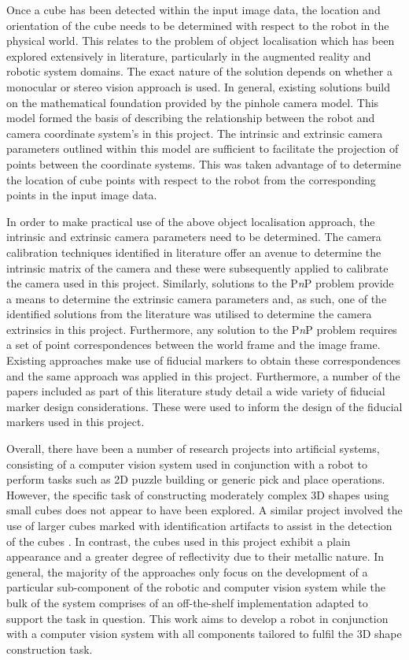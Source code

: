 Once a cube has been detected within the input image data, the location and orientation of the cube needs to be determined with respect to the robot in the physical world. This relates to the problem of object localisation which has been explored extensively in literature, particularly in the augmented reality and robotic system domains. The exact nature of the solution depends on whether a monocular or stereo vision approach is used. In general, existing solutions build on the mathematical foundation provided by the pinhole camera model. This model formed the basis of describing the relationship between the robot and camera coordinate system's in this project. The intrinsic and extrinsic camera parameters outlined within this model are sufficient to facilitate the projection of points between the coordinate systems. This was taken advantage of to determine the location of cube points with respect to the robot from the corresponding points in the input image data.

In order to make practical use of the above object localisation approach, the intrinsic and extrinsic camera parameters need to be determined. The camera calibration techniques identified in literature offer an avenue to determine the intrinsic matrix of the camera and these were subsequently applied to calibrate the camera used in this project. Similarly, solutions to the P\textit{n}P problem provide a means to determine the extrinsic camera parameters and, as such, one of the identified solutions from the literature was utilised to determine the camera extrinsics in this project. Furthermore, any solution to the P\textit{n}P problem requires a set of point correspondences between the world frame and the image frame. Existing approaches make use of fiducial markers to obtain these correspondences and the same approach was applied in this project. Furthermore, a number of the papers included as part of this literature study detail a wide variety of fiducial marker design considerations. These were used to inform the design of the fiducial markers used in this project.

Overall, there have been a number of research projects into artificial systems, consisting of a computer vision system used in conjunction with a robot to perform tasks such as 2D puzzle building or generic pick and place operations. However, the specific task of constructing moderately complex 3D shapes using small cubes does not appear to have been explored. A similar project involved the use of larger cubes marked with identification artifacts to assist in the detection of the cubes \cite{Lin:Character_Cube_Stacking_Robot}. In contrast, the cubes used in this project exhibit a plain appearance and a greater degree of reflectivity due to their metallic nature. In general, the majority of the approaches only focus on the development of a particular sub-component of the robotic and computer vision system while the bulk of the system comprises of an off-the-shelf implementation adapted to support the task in question. This work aims to develop a robot in conjunction with a computer vision system with all components tailored to fulfil the 3D shape construction task.

\newpage

